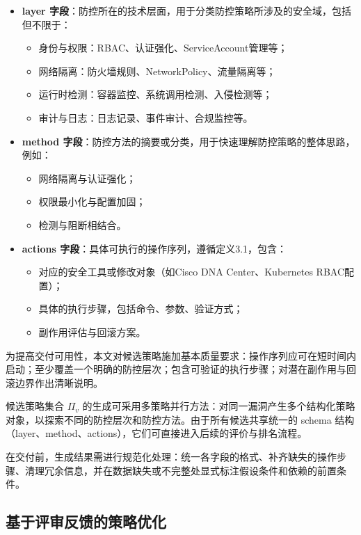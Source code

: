 \begin{itemize}
    \item \textbf{layer 字段}：防控所在的技术层面，用于分类防控策略所涉及的安全域，包括但不限于：
    \begin{itemize}
        \item 身份与权限：RBAC、认证强化、ServiceAccount管理等；
        \item 网络隔离：防火墙规则、NetworkPolicy、流量隔离等；
        \item 运行时检测：容器监控、系统调用检测、入侵检测等；
        \item 审计与日志：日志记录、事件审计、合规监控等。
    \end{itemize}
    \item \textbf{method 字段}：防控方法的摘要或分类，用于快速理解防控策略的整体思路，例如：
    \begin{itemize}
        \item 网络隔离与认证强化；
        \item 权限最小化与配置加固；
        \item 检测与阻断相结合。
    \end{itemize}
    \item \textbf{actions 字段}：具体可执行的操作序列，遵循定义3.1，包含：
    \begin{itemize}
        \item 对应的安全工具或修改对象（如Cisco DNA Center、Kubernetes RBAC配置）；
        \item 具体的执行步骤，包括命令、参数、验证方式；
        \item 副作用评估与回滚方案。
    \end{itemize}
\end{itemize}


为提高交付可用性，本文对候选策略施加基本质量要求：操作序列应可在短时间内启动；至少覆盖一个明确的防控层次；包含可验证的执行步骤；对潜在副作用与回滚边界作出清晰说明。

候选策略集合 $\Pi_v$ 的生成可采用多策略并行方法：对同一漏洞产生多个结构化策略对象，以探索不同的防控层次和防控方法。由于所有候选共享统一的 schema 结构（layer、method、actions），它们可直接进入后续的评价与排名流程。

在交付前，生成结果需进行规范化处理：统一各字段的格式、补齐缺失的操作步骤、清理冗余信息，并在数据缺失或不完整处显式标注假设条件和依赖的前置条件。

\subsection{基于评审反馈的策略优化}

